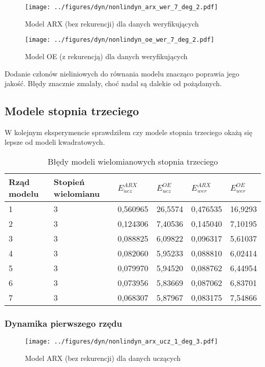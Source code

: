 \documentclass[a4paper,titlepage,11pt,floatssmall]{mwrep}
\begin{document}
\begin{figure}[H]
\centering
\texttt{[image: ../figures/dyn/nonlindyn\_arx\_wer\_7\_deg\_2.pdf]}
\caption{Model ARX (bez rekurencji) dla danych weryfikujących}
\end{figure}

\begin{figure}[H]
\centering
\texttt{[image: ../figures/dyn/nonlindyn\_oe\_wer\_7\_deg\_2.pdf]}
\caption{Model OE (z rekurencją) dla danych weryfikujących}
\end{figure}

Dodanie członów nieliniowych do równania modelu znacząco poprawia jego jakość. Błędy znacznie zmalały, choć nadal są dalekie od pożądanych. 

\subsection{Modele stopnia trzeciego}
W kolejnym eksperymencie sprawdziłem czy modele stopnia trzeciego okażą się lepsze od modeli kwadratowych.

\begin{table}[H]
\centering
\caption{Błędy modeli wielomianowych stopnia trzeciego}
\begin{tabular}{|l|l|l|l|l|l|}
\hline
Rząd modelu & Stopień wielomianu & $E_{ucz}^{ARX}$    & $E_{ucz}^{OE}$   & $E_{wer}^{ARX}$    & $E_{wer}^{OE}$   \\ \hline
1           & 3                  & 0,560965 & 26,5574 & 0,476535 & 16,9293 \\ \hline
2           & 3                  & 0,124306 & 7,40536 & 0,145040 & 7,10195 \\ \hline
3           & 3                  & 0,088825 & 6,09822 & 0,096317 & 5,61037 \\ \hline
4           & 3                  & 0,082060 & 5,95233 & 0,088810 & 6,02414 \\ \hline
5           & 3                  & 0,079970 & 5,94520 & 0,088762 & 6,44954 \\ \hline
6           & 3                  & 0,073956 & 5,83669 & 0,087062 & 6,83701 \\ \hline
7           & 3                  & 0,068307 & 5,87967 & 0,083175 & 7,54866 \\ \hline
\end{tabular}
\end{table}

\newpage
\subsubsection{Dynamika pierwszego rzędu}
\begin{figure}[H]
\centering
\texttt{[image: ../figures/dyn/nonlindyn\_arx\_ucz\_1\_deg\_3.pdf]}
\caption{Model ARX (bez rekurencji) dla danych uczących}
\end{figure}
\end{document}
